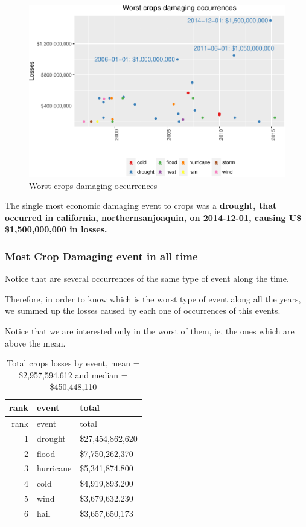 \documentclass[]{article}
\begin{document}
\begin{figure}[htbp]
\centering
\includegraphics{readme_files/figure-latex/crop-single-plot-1.pdf}
\caption{Worst crops damaging occurrences}
\end{figure}

The single most economic damaging event to crops was a \textbf{drought,
that occurred in california, northernsanjoaquin, on 2014-12-01, causing
U\$ \$1,500,000,000 in losses.}

\subsubsection{Most Crop Damaging event in all
time}\label{most-crop-damaging-event-in-all-time}

Notice that are several occurrences of the same type of event along the
time.

Therefore, in order to know which is the worst type of event along all
the years, we summed up the losses caused by each one of occurrences of
this events.

Notice that we are interested only in the worst of them, ie, the ones
which are above the mean.

\begin{longtable}[]{@{}rll@{}}
\caption{Total crops losses by event, mean = \$2,957,594,612 and median
= \$450,448,110}\tabularnewline
\toprule
rank & event & total\tabularnewline
\midrule
\endfirsthead
\toprule
rank & event & total\tabularnewline
\midrule
\endhead
1 & drought & \$27,454,862,620\tabularnewline
2 & flood & \$7,750,262,370\tabularnewline
3 & hurricane & \$5,341,874,800\tabularnewline
4 & cold & \$4,919,893,200\tabularnewline
5 & wind & \$3,679,632,230\tabularnewline
6 & hail & \$3,657,650,173\tabularnewline
\bottomrule
\end{longtable}
\end{document}

